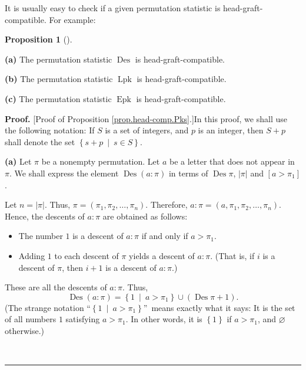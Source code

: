 \documentclass[numbers=enddot,12pt,final,onecolumn,notitlepage]{scrartcl}%
\theoremstyle{definition}
\newtheorem{prop}[theo]{Proposition}
\newenvironment{proposition}[1][]
{\begin{prop}[#1]\begin{leftbar}}
{\end{leftbar}\end{prop}}
\newenvironment{proof}[1][Proof]{\noindent\textbf{#1.} }{\ \rule{0.5em}{0.5em}}
\begin{document}
It is usually easy to check if a given permutation statistic is
head-graft-compatible. For example:

\begin{proposition}
\label{prop.head-comp.Pks}\textbf{(a)} The permutation statistic
$\operatorname{Des}$ is head-graft-compatible.

\textbf{(b)} The permutation statistic $\operatorname*{Lpk}$ is head-graft-compatible.

\textbf{(c)} The permutation statistic $\operatorname{Epk}$ is head-graft-compatible.
\end{proposition}

\begin{proof}
[Proof of Proposition \ref{prop.head-comp.Pks}.]In this proof, we shall use
the following notation: If $S$ is a set of integers, and $p$ is an integer,
then $S+p$ shall denote the set $\left\{  s+p\ \mid\ s\in S\right\}  $.

\textbf{(a)} Let $\pi$ be a nonempty permutation. Let $a$ be a letter that
does not appear in $\pi$. We shall express
the element $\operatorname{Des}\left(  a:\pi\right)  $ in terms of
$\operatorname{Des}\pi$, $\left|\pi\right|$
and $\left[  a>\pi_{1}\right]  $.

Let $n=\left\vert \pi\right\vert $. Thus, $\pi=\left(  \pi_{1},\pi
_{2},\ldots,\pi_{n}\right)  $. Therefore, $a:\pi=\left(  a,\pi_{1},\pi_{2}%
,\ldots,\pi_{n}\right)  $. Hence, the descents of $a:\pi$ are obtained as follows:

\begin{itemize}
\item The number $1$ is a descent of $a:\pi$ if and only if $a>\pi_{1}$.

\item Adding $1$ to each descent of $\pi$ yields a descent of $a:\pi$. (That
is, if $i$ is a descent of $\pi$, then $i+1$ is a descent of $a:\pi$.)
\end{itemize}

These are all the descents of $a:\pi$. Thus,%
\begin{equation}
\operatorname{Des}\left(  a:\pi\right)  =\left\{  1\ \mid\ a>\pi_{1}\right\}
\cup\left(  \operatorname{Des}\pi+1\right)  .
\label{pf.prop.head-comp.Pks.a.1}%
\end{equation}
(The strange notation \textquotedblleft$\left\{  1\ \mid\ a>\pi_{1}\right\}
$\textquotedblright\ means exactly what it says: It is the set of all numbers
$1$ satisfying $a>\pi_{1}$. In other words, it is $\left\{  1\right\}  $ if
$a>\pi_{1}$, and $\varnothing$ otherwise.)


\end{proof}
\end{document}
